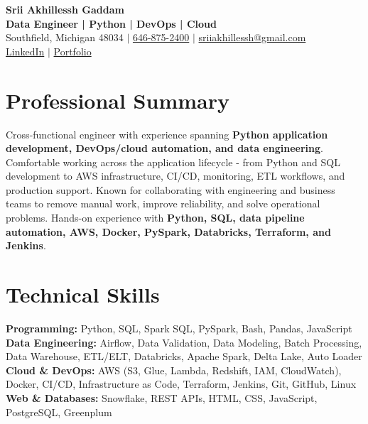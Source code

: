 \documentclass[letterpaper,10pt]{article}
\begin{document}
\fontsize{9.35pt}{10.45pt}\selectfont

\begin{center}
    {\LARGE \textbf{Srii Akhillessh Gaddam}} \\[-1pt]
    \textbf{Data Engineer | Python | DevOps | Cloud} \\[2pt]
    Southfield, Michigan 48034 $|$
    \href{tel:6468752400}{646-875-2400} $|$
    \href{mailto:sriiakhillessh@gmail.com}{sriiakhillessh@gmail.com} \\[1pt]
    \href{https://www.linkedin.com/in/srii-akhiilessh-gaddam-b48668191/}{LinkedIn} $|$
    \href{https://sriiakhillesshg.github.io/portfolio/}{Portfolio}
\end{center}
\vspace{-8pt}

\section{Professional Summary}
\small{Cross-functional engineer with experience spanning \textbf{Python application development, DevOps/cloud automation, and data engineering}. Comfortable working across the application lifecycle - from Python and SQL development to AWS infrastructure, CI/CD, monitoring, ETL workflows, and production support. Known for collaborating with engineering and business teams to remove manual work, improve reliability, and solve operational problems. Hands-on experience with \textbf{Python, SQL, data pipeline automation, AWS, Docker, PySpark, Databricks, Terraform, and Jenkins}.}

\section{Technical Skills}
\small{
\textbf{Programming:} Python, SQL, Spark SQL, PySpark, Bash, Pandas, JavaScript \\
\textbf{Data Engineering:} Airflow, Data Validation, Data Modeling, Batch Processing, Data Warehouse, ETL/ELT, Databricks, Apache Spark, Delta Lake, Auto Loader \\
\textbf{Cloud \& DevOps:} AWS (S3, Glue, Lambda, Redshift, IAM, CloudWatch), Docker, CI/CD, Infrastructure as Code, Terraform, Jenkins, Git, GitHub, Linux \\
\textbf{Web \& Databases:} Snowflake, REST APIs, HTML, CSS, JavaScript, PostgreSQL, Greenplum
}
\end{document}
